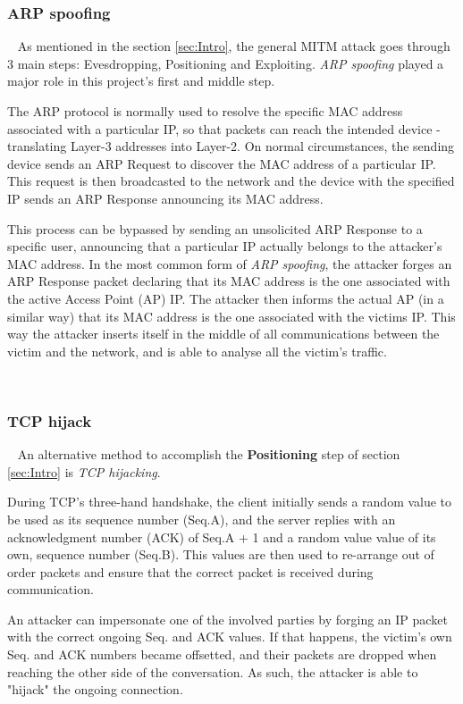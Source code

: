 \subsubsection{ARP spoofing}

~\newline
As mentioned in the section \ref{sec:Intro}, the general MITM attack goes 
through 3 main steps: Evesdropping, Positioning and Exploiting. 
\textit{ARP spoofing} played a major role in this project's first and middle 
step.

The ARP protocol is normally used to resolve the specific MAC address associated
with a particular IP, so that packets can reach the intended device - 
translating Layer-3 addresses into Layer-2.
On normal circumstances, the sending device sends an ARP Request to discover the
MAC address of a particular IP.
This request is then broadcasted to the network and the device with the 
specified IP sends an ARP Response announcing its MAC address.

This process can be bypassed by sending an unsolicited ARP Response to a 
specific user, announcing that a particular IP actually belongs to the 
attacker's MAC address.
In the most common form of \textit{ARP spoofing}, the attacker forges an ARP 
Response packet declaring that its MAC address is the one associated with the
active Access Point (AP) IP. 
The attacker then informs the actual AP (in a similar way) that its MAC address
is the one associated with the victims IP.
This way the attacker inserts itself in the middle of all communications 
between the victim and the network, and is able to analyse all the victim's 
traffic.

~
\subsubsection{TCP hijack}

~\newline
An alternative method to accomplish the \textbf{Positioning} step of section
\ref{sec:Intro} is \textit{TCP hijacking}. 

During TCP's three-hand handshake, the client initially sends a random value to
be used as its sequence number (Seq.A), and the server replies with an 
acknowledgment number (ACK) of Seq.A + 1 and a random value value of its own, 
sequence number (Seq.B).
This values are then used to re-arrange out of order packets and ensure that 
the correct packet is received during communication.

An attacker can impersonate one of the involved parties by forging an IP packet 
with the correct ongoing Seq. and ACK values. 
If that happens, the victim's own Seq. and ACK numbers became offsetted, and 
their packets are dropped when reaching the other side of the conversation.
As such, the attacker is able to "hijack" the ongoing connection.

